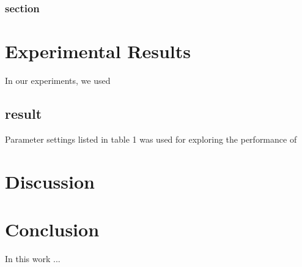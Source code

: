 \documentclass[12pt,letterpaper]{article}
\begin{document}
\subsubsection{section}
\section{Experimental Results}
In our experiments, we used 
\subsection{result}
Parameter settings listed in table 1 was used for exploring the performance of 
\section{Discussion}
\section{Conclusion}
In this work ...
\newpage
\end{document}
